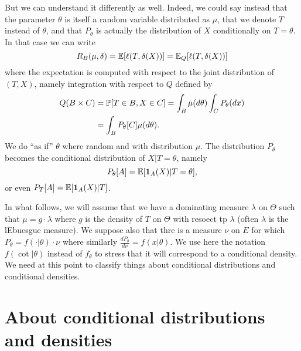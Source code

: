 But we can understand it differently as well. 
Indeed, we could say instead that the parameter $\theta$ is itself a random variable distributed as $\mu$, that we denote $T$ instead of $\theta$, and that $P_\theta$ is actually the distribution of $X$ conditionally on $T = \theta$. 
In that case we can write
\begin{equation*}
	R_B(\mu, \delta) = \E[ \ell(T, \delta(X))] = \E_Q[ \ell(T, \delta(X))]
\end{equation*}
where the expectation is computed with respect to the joint distribution of $(T, X)$, namely integration with respect to $Q$ defined by
\begin{align*}
	Q(B \times C) &= \P[ T \in B, X \in C] = \int_B \mu(d \theta) \int_C P_\theta(dx) \\
	&= \int_B P_\theta[C] \mu(d \theta).
\end{align*}
We do ``as if'' $\theta$ where random and with distribution $\mu$.
The distribution $P_\theta$ becomes the conditional distribution of $X | T = \theta$, namely
\begin{equation*}
	P_\theta[A] = \E [\ind{A}(X) | T = \theta],
\end{equation*}
or even $P_T[A] = \E [\ind{A}(X) | T]$.

In what follows, we will assume that we have a dominating measure $\lambda$ on $\Theta$ such that $\mu = g \cdot \lambda$ where $g$ is the density of $T$ on $\Theta$ with resoect tp $\lambda$ (often $\lambda$ is the lEbuesgue measure).
We suppose also that thre is a measure $\nu$ on $E$ for which $P_\theta = f(\cdot | \theta) \cdot \nu$ where similarly $\frac{d P_\theta}{d \nu} = f(x | \theta)$. 
We use here the notation $f(\cot | \theta)$ instead of $f_\theta$ to stress that it will correspond to a conditional density.
We need at this point to classify things about conditional distributions and conditional densities.

\section{About conditional distributions and densities} %
\label{sec:about_conditional_distributions_and_densities}

